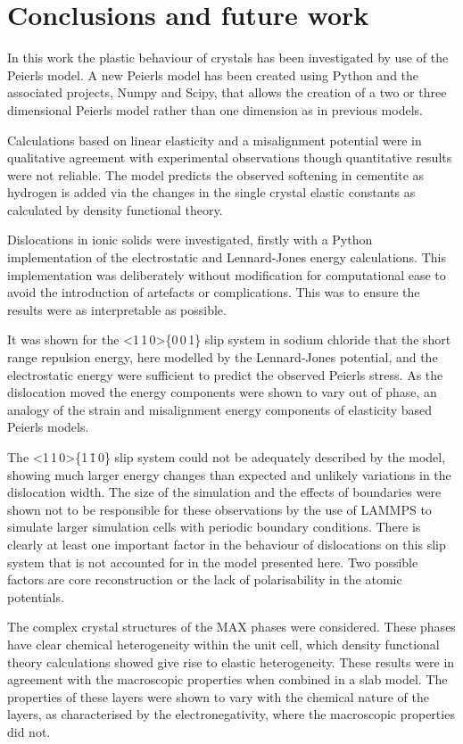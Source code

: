 \chapter{Conclusions and future work}



In this work the plastic behaviour of crystals has been investigated by use of the Peierls model. A new Peierls model has been created using Python and the associated projects, Numpy and Scipy, that allows the creation of a two or three dimensional Peierls model rather than one dimension as in previous models.

Calculations based on linear elasticity and a misalignment potential were in qualitative agreement with experimental observations though quantitative results were not reliable. The model predicts the observed softening in cementite as hydrogen is added via the changes in the single crystal elastic constants as calculated by density functional theory.

Dislocations in ionic solids were investigated, firstly with a Python implementation of the electrostatic and Lennard-Jones energy calculations. This implementation was deliberately without modification for computational ease to avoid the introduction of artefacts or complications. This was to ensure the results were as interpretable as possible.

It was shown for the <1\,1\,0>\{0\,0\,1\} slip system in sodium chloride that the short range repulsion energy, here modelled by the Lennard-Jones potential, and the electrostatic energy were sufficient to predict the observed Peierls stress. As the dislocation moved the energy components were shown to vary out of phase, an analogy of the strain and misalignment energy components of elasticity based Peierls models.

The <1\,1\,0>\{1\,\={1}\,0\} slip system could not be adequately described by the model, showing much larger energy changes than expected and unlikely variations in the dislocation width. The size of the simulation and the effects of boundaries were shown not to be responsible for these observations by the use of LAMMPS to simulate larger simulation cells with periodic boundary conditions. There is clearly at least one important factor in the behaviour of dislocations on this slip system that is not accounted for in the model presented here. Two possible factors are core reconstruction or the lack of polarisability in the atomic potentials.

The complex crystal structures of the MAX phases were considered. These phases have clear chemical heterogeneity within the unit cell, which density functional theory calculations showed give rise to elastic heterogeneity. These results were in agreement with the macroscopic properties when combined in a slab model. The properties of these layers were shown to vary with the chemical nature of the layers, as characterised by the electronegativity, where the macroscopic properties did not.

